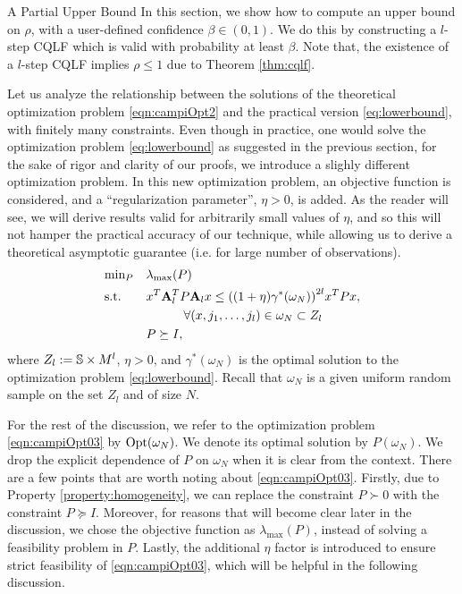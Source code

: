 \begin{subsection}{A Partial Upper Bound}\label{sec:IntroMainThm}
In this section, we show how to compute an upper bound on $\rho$, with a user-defined confidence $\beta \in (0, 1)$. We do this by constructing a $l$-step CQLF which is valid with probability at least $\beta$. Note that, the existence of a $l$-step CQLF implies $\rho \leq 1$ due to Theorem \ref{thm:cqlf}.

Let us analyze the relationship between the solutions of the theoretical optimization problem \eqref{eqn:campiOpt2} and the practical version \eqref{eq:lowerbound}, with finitely many constraints. Even though in practice, one would solve the optimization problem  \eqref{eq:lowerbound} as suggested in the previous section, for the sake of rigor and clarity of our proofs, we introduce a slighly different optimization problem. In this new optimization problem, an objective function is considered, and a ``regularization parameter'', $\eta > 0$, is added. As the reader will see, we will derive results valid for arbitrarily small values of $\eta$, and so this will not hamper the practical accuracy of our technique, while allowing us to derive a theoretical asymptotic guarantee (i.e. for large number of observations).
\begin{equation}\label{eqn:campiOpt03}
\begin{aligned}
& \text{min}_{P} & & \lambda_{\max}(P) \\
& \text{s.t.} 
&  & x^T\mathbf{A}_l^T P \mathbf{A}_l x \leq {((1 +\eta)\gamma^*(\omega_N))}^{2l} x^T P x,\\
&&&\qquad \quad \forall (x, j_{1},\dots, j_{l}) \in \omega_N \subset Z_l \\
& && P \succeq I, \\
\end{aligned}
\end{equation}
where $Z_l:= \mathbb{S} \times M^l$, $\eta > 0$, and $\gamma^*(\omega_N)$ is the optimal solution to the optimization problem \eqref{eq:lowerbound}. Recall that $\omega_N$ is a given uniform random sample on the set $Z_l$ and of size $N$. 

For the rest of the discussion, we refer to the optimization problem \eqref{eqn:campiOpt03} by $ \text{Opt}(\omega_N)$. We denote its optimal solution by $P(\omega_N)$. We drop the explicit dependence of $P$ on $\omega_N$ when it is clear from the context. There are a few points that are worth noting about \eqref{eqn:campiOpt03}. Firstly, due to Property \ref{property:homogeneity}, we can replace the constraint $P \succ 0$ with the constraint $P \succeq I$. Moreover, for reasons that will become clear later in the discussion, we chose the objective function as $\lambda_{\max}(P)$, instead of solving a feasibility problem in $P$. Lastly, the additional $\eta$ factor is introduced to ensure strict feasibility of \eqref{eqn:campiOpt03}, which will be helpful in the following discussion.


\end{subsection}
